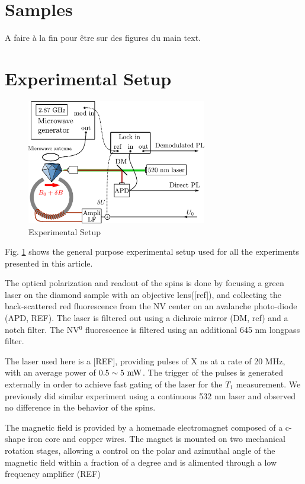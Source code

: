 \documentclass[preprintnumbers,amsmath,amssymb,onecolumn,12pt]{revtex4-2}
\begin{document}
\section{Samples}
A faire à la fin pour être sur des figures du main text.
\section{Experimental Setup}
\begin{figure}
\includegraphics[width=0.7\textwidth]{Figures_SI/shema_exp}
\caption{Experimental Setup}
\label{setup}
\end{figure}
Fig. \ref{setup} shows the general purpose experimental setup used for all the experiments presented in this article.

The optical polarization and readout of the spins is done by focusing a green laser on the diamond sample with an objective lens([ref]), and collecting the back-scattered red fluorescence from the NV center on an avalanche photo-diode (APD, REF). The laser is filtered out using a dichroic mirror (DM, ref) and a notch filter. The NV$^0$ fluorescence is filtered using an additional 645 nm longpass filter.

The laser used here is a [REF], providing pulses of X ns at a rate of 20 MHz, with an average power of $0.5 \sim 5\ \rm mW$. The trigger of the pulses is generated externally in order to achieve fast  gating of the laser for the $T_1$ measurement. We previously did similar experiment using a continuous 532 nm laser and observed no difference in the behavior of the spins.

The magnetic field is provided by a homemade electromagnet composed of a c-shape iron core and  copper wires. The magnet is mounted on two mechanical rotation stages, allowing a control on the polar and azimuthal angle of the magnetic field within a fraction of a degree and is alimented through a low frequency amplifier (REF)
\end{document}
